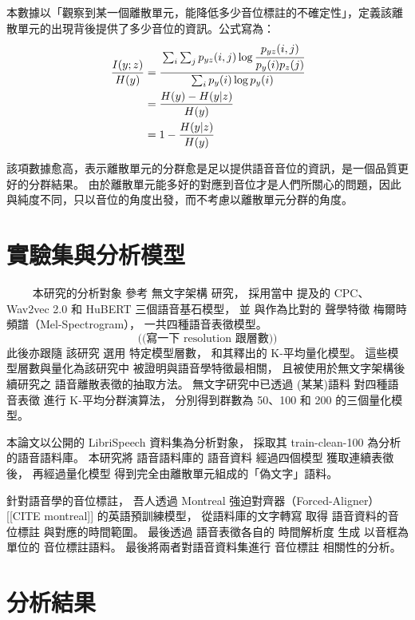 本數據以「觀察到某一個離散單元，能降低多少音位標註的不確定性」，定義該離散單元的出現背後提供了多少音位的資訊。公式寫為：
\begin{align}
\frac{I(y;z)}{H(y)}&=\cfrac{\sum_i \sum_j p_{yz}(i, j) \log \cfrac{p_{yz}(i, j)}{p_y(i)p_z(j)}}{\sum_i p_y(i) \log p_y(i)} \\
&=\frac{H(y)-H(y|z)}{H(y)} \\
&=1-\frac{H(y|z)}{H(y)}
\end{align}

該項數據愈高，表示離散單元的分群愈是足以提供語音音位的資訊，是一個品質更好的分群結果。
由於離散單元能多好的對應到音位才是人們所關心的問題，因此與純度不同，只以音位的角度出發，而不考慮以離散單元分群的角度。



\section{實驗集與分析模型}
　　
本研究的分析對象
參考
無文字架構 \cite{noauthor_textless_2021, lakhotia_generative_2021, lakhotia_generative_2021-1}  
研究，
採用當中
提及的 CPC、Wav2vec 2.0 和 HuBERT 三個語音基石模型，
並
與作為比對的
聲學特徵
梅爾時頻譜（Mel-Spectrogram），
一共四種語音表徵模型。
$$
\text{((寫一下 resolution 跟層數))}
$$
此後亦跟隨
該研究
選用
特定模型層數，
和其釋出的
K-平均量化模型。
這些模型層數與量化為該研究中
被證明與語音學特徵最相關，
且被使用於無文字架構後續研究之
語音離散表徵的抽取方法。
無文字研究中已透過
(某某)語料
對四種語音表徵
進行 K-平均分群演算法，
分別得到群數為 50、100 和 200 的三個量化模型。

本論文以公開的 LibriSpeech 資料集為分析對象，
採取其 train-clean-100 為分析的語音語料庫。
本研究將
語音語料庫的
語音資料
經過四個模型
獲取連續表徵後，
再經過量化模型
得到完全由離散單元組成的「偽文字」語料。

針對語音學的音位標註，
吾人透過 Montreal 強迫對齊器（Forced-Aligner） [[CITE montreal]]
的英語預訓練模型，
從語料庫的文字轉寫
取得
語音資料的音位標註
與對應的時間範圍。
最後透過
語音表徵各自的
時間解析度
生成
以音框為單位的
音位標註語料。
最後將兩者對語音資料集進行
音位標註
相關性的分析。



\section{分析結果}



